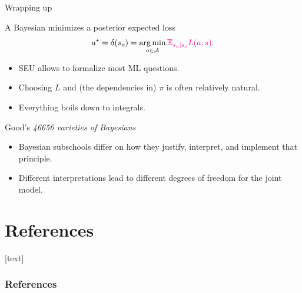 \documentclass[10pt]{beamer}
\begin{document}



\begin{frame}{Wrapping up}
  \begin{block}{A Bayesian minimizes a posterior expected loss}
  $$
    a^\star = \delta(s_o) = \operatorname*{arg\,min}_{a\in\mathcal{A}} \textcolor{magenta}{\mathbb{E}_{s_{\text{u}}\vert s_{o}} L(a,s)}.
  $$
  \end{block}
  \vfill
  \begin{itemize}
    \item SEU allows to formalize most ML questions.
    \item Choosing $L$ and (the dependencies in) $\pi$ is often relatively natural.
    \item Everything boils down to integrals.
  \end{itemize}
  \vfill
  \begin{alertblock}{Good's {\it 46656 varieties of Bayesians}}
    \begin{itemize}
      \item Bayesian subschools differ on how they justify, interpret, and implement that principle.
      \item Different interpretations lead to different degrees of freedom for the joint model.
    \end{itemize}
  \end{alertblock}
  
\end{frame}

\nocite{MaRo07,PaIn09,Rob07}

\section*{References}
[text]%
\begin{frame}[allowframebreaks]
\frametitle{References}
\small
\printbibliography
\normalsize
\end{frame}
\end{document}
